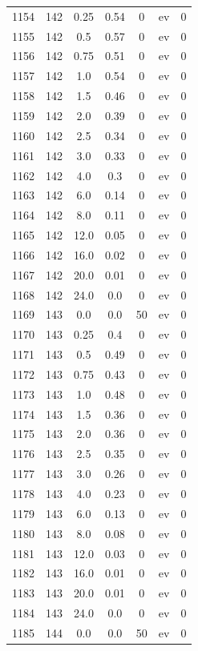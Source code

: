 \documentclass[12pt,a4paper]{article}
\begin{document}
\begin{tabular}{r|cccccc}
	1154 & 142 & 0.25 & 0.54 & 0 & ev & 0 \\
	1155 & 142 & 0.5 & 0.57 & 0 & ev & 0 \\
	1156 & 142 & 0.75 & 0.51 & 0 & ev & 0 \\
	1157 & 142 & 1.0 & 0.54 & 0 & ev & 0 \\
	1158 & 142 & 1.5 & 0.46 & 0 & ev & 0 \\
	1159 & 142 & 2.0 & 0.39 & 0 & ev & 0 \\
	1160 & 142 & 2.5 & 0.34 & 0 & ev & 0 \\
	1161 & 142 & 3.0 & 0.33 & 0 & ev & 0 \\
	1162 & 142 & 4.0 & 0.3 & 0 & ev & 0 \\
	1163 & 142 & 6.0 & 0.14 & 0 & ev & 0 \\
	1164 & 142 & 8.0 & 0.11 & 0 & ev & 0 \\
	1165 & 142 & 12.0 & 0.05 & 0 & ev & 0 \\
	1166 & 142 & 16.0 & 0.02 & 0 & ev & 0 \\
	1167 & 142 & 20.0 & 0.01 & 0 & ev & 0 \\
	1168 & 142 & 24.0 & 0.0 & 0 & ev & 0 \\
	1169 & 143 & 0.0 & 0.0 & 50 & ev & 0 \\
	1170 & 143 & 0.25 & 0.4 & 0 & ev & 0 \\
	1171 & 143 & 0.5 & 0.49 & 0 & ev & 0 \\
	1172 & 143 & 0.75 & 0.43 & 0 & ev & 0 \\
	1173 & 143 & 1.0 & 0.48 & 0 & ev & 0 \\
	1174 & 143 & 1.5 & 0.36 & 0 & ev & 0 \\
	1175 & 143 & 2.0 & 0.36 & 0 & ev & 0 \\
	1176 & 143 & 2.5 & 0.35 & 0 & ev & 0 \\
	1177 & 143 & 3.0 & 0.26 & 0 & ev & 0 \\
	1178 & 143 & 4.0 & 0.23 & 0 & ev & 0 \\
	1179 & 143 & 6.0 & 0.13 & 0 & ev & 0 \\
	1180 & 143 & 8.0 & 0.08 & 0 & ev & 0 \\
	1181 & 143 & 12.0 & 0.03 & 0 & ev & 0 \\
	1182 & 143 & 16.0 & 0.01 & 0 & ev & 0 \\
	1183 & 143 & 20.0 & 0.01 & 0 & ev & 0 \\
	1184 & 143 & 24.0 & 0.0 & 0 & ev & 0 \\
	1185 & 144 & 0.0 & 0.0 & 50 & ev & 0 \\

\end{tabular}
\end{document}
